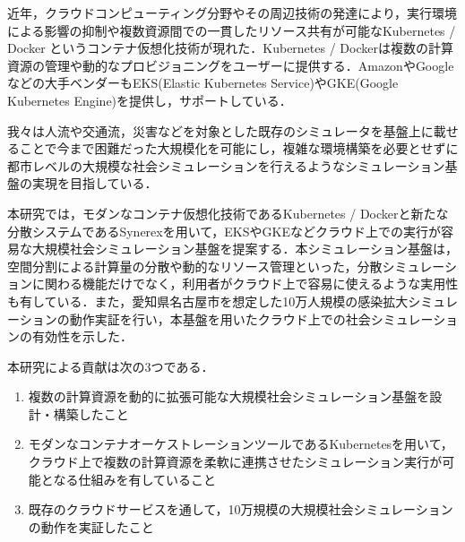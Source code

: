 \documentclass[originalpaper]{jsaiart}     %
\begin{document}
近年，クラウドコンピューティング分野やその周辺技術の発達により，実行環境による影響の抑制や複数資源間での一貫したリソース共有が可能なKubernetes / Docker \cite{Bernstein}というコンテナ仮想化技術が現れた．Kubernetes / Dockerは複数の計算資源の管理や動的なプロビジョニングをユーザーに提供する．AmazonやGoogleなどの大手ベンダーもEKS(Elastic Kubernetes Service)やGKE(Google Kubernetes Engine)を提供し，サポートしている．



我々は人流や交通流，災害などを対象とした既存のシミュレータを基盤上に載せることで今まで困難だった大規模化を可能にし，複雑な環境構築を必要とせずに都市レベルの大規模な社会シミュレーションを行えるようなシミュレーション基盤の実現を目指している．

本研究では，モダンなコンテナ仮想化技術であるKubernetes / Dockerと新たな分散システムであるSynerex\cite{Kawaguchi}を用いて，EKSやGKEなどクラウド上での実行が容易な大規模社会シミュレーション基盤を提案する．本シミュレーション基盤は，空間分割による計算量の分散や動的なリソース管理といった，分散シミュレーションに関わる機能だけでなく，利用者がクラウド上で容易に使えるような実用性も有している．また，愛知県名古屋市を想定した10万人規模の感染拡大シミュレーションの動作実証を行い，本基盤を用いたクラウド上での社会シミュレーションの有効性を示した．

本研究による貢献は次の3つである．
\begin{enumerate}
    \item 複数の計算資源を動的に拡張可能な大規模社会シミュレーション基盤を設計・構築したこと
    \item モダンなコンテナオーケストレーションツールであるKubernetesを用いて，クラウド上で複数の計算資源を柔軟に連携させたシミュレーション実行が可能となる仕組みを有していること
    \item 既存のクラウドサービスを通して，10万規模の大規模社会シミュレーションの動作を実証したこと
 \end{enumerate}
\end{document}
